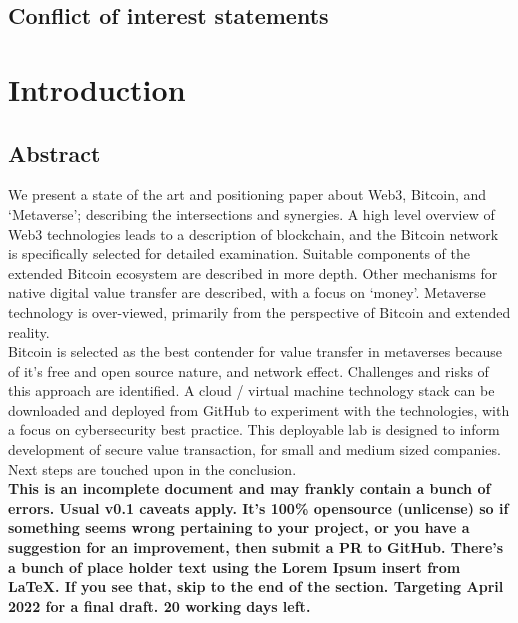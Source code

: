\documentclass[
	11pt, %
	fleqn, %
	a4paper, %
]{LegrandOrangeBook}
\begin{document}

\chapterspaceabove{6.75cm} %
\chapterspacebelow{7.25cm} %


\section{Conflict of interest statements}

\chapter{Introduction}
\section{Abstract}
We present a state of the art and positioning paper about Web3, Bitcoin, and `Metaverse'; describing the intersections and synergies. A high level overview of Web3 technologies leads to a description of blockchain, and the Bitcoin network is specifically selected for detailed examination. Suitable components of the extended Bitcoin ecosystem are described in more depth. Other mechanisms for native digital value transfer are described, with a focus on `money'. Metaverse technology is over-viewed, primarily from the perspective of Bitcoin and extended reality.\\
Bitcoin is selected as the best contender for value transfer in metaverses because of it's free and open source nature, and network effect. Challenges and risks of this approach are identified. A cloud / virtual machine technology stack can be downloaded and deployed from GitHub to experiment with the technologies, with a focus on cybersecurity best practice. This deployable lab is designed to inform development of secure value transaction, for small and medium sized companies. Next steps are touched upon in the conclusion.\\
\textbf{This is an incomplete document and may frankly contain a bunch of errors. Usual v0.1 caveats apply. It's 100\% opensource (unlicense) so if something seems wrong pertaining to your project, or you have a suggestion for an improvement, then submit a PR to GitHub. There's a bunch of place holder text using the Lorem Ipsum insert from LaTeX. If you see that, skip to the end of the section. Targeting April 2022 for a final draft. 20 working days left.}
\end{document}
